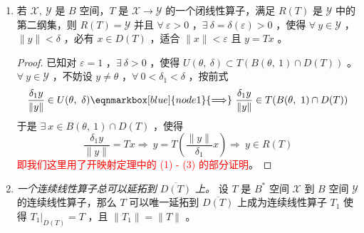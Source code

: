 \begin{enumerate}[leftmargin=2cm, label=\arabic*]
\begin{proof}
    而后我们证明：$TB(\theta,\ 1)\supset U(\theta,\ \delta)$ ，$\forall\ y_0\in U(\theta,\ \delta)$ ，要证明 $\exists\ x_0\in B(\theta,\ 1)$ ，使得 $Tx_0=y_0$ 。即求方程 $Tx = y_0$ 在 $B(\theta,\ 1)$ 的一个解。我们利用逐步逼近法即可。对于 $y_0\in U(\theta,\ \delta)$ ，考虑 $\exists\ x_1\in B(0,\ \frac{1}{3})$ ，使得 $\|y_0 - Tx_1\| < \frac{\delta}{3}$ 。
    
    而后对 $y = y_0 - Tx_1\in U(\theta,\ \frac{\delta}{3})$ ，$\exists\ x_2\in B(\theta,\ \frac{1}{3^2})$ ，使得
\begin{align*}
    \|y_1 - Tx_2\| < \frac{\delta}{3^2}
\end{align*}
    而后我们构建的这一组，令 $x_0 \triangleq \sum\limits_{n=1}^{\infty} x_n$ ，便有 $x_0 \in B(0,\ 1)$ ，而 
\begin{align*}
    \|y_n\| = \|y_{n-1} - Tx_n\| = \|y_0 - T(x_1 + x_2 + \cdots + x_n)\| < \frac{\delta}{3^n} \to 0
\end{align*}
    而由于 $T$ 是连续的，故而 $Tx_0 = y_0$ 。即 $Y(\theta,\ \delta) \subset TB(\theta,\ 1)$ 。 
\end{proof}
    \item 若 $\mathscr{X},\ \mathscr{Y}$ 是 $B$ 空间，$T$ 是 $\mathscr{X}\to\mathscr{Y}$ 的一个闭线性算子，满足 $R(T)$ 是 $\mathscr{Y}$ 中的第二纲集，则 $R(T) =\mathscr{Y}$ 并且 $\forall\ \varepsilon > 0$ ，$\exists\ \delta = \delta(\varepsilon) > 0$ ，使得 $\forall\ y\in\mathscr{Y}$ ，$\|y\|<\delta$ ，必有 $x\in D(T)$ ，适合 $\|x\| < \varepsilon$ 且 $y = Tx$ 。
\begin{proof}
    已知对 $\varepsilon = 1$ ，$\exists\ \delta > 0$ ，使得 $U(\theta,\ \delta) \subset T(B(\theta,\ 1) \cap D(T))$ 。$\forall\ y\in\mathscr{Y}$ ，不妨设 $y\neq \theta$ ，$\forall\ 0<\delta_1 < \delta$ ，按前式
\begin{equation*}
    \frac{\delta_1 y}{\|y\|} \in U(\theta,\ \delta) \eqnmarkbox[blue]{node1}{\Longrightarrow}\ \frac{\delta_1 y}{\|y\|}\in T(B(\theta,\ 1) \cap D(T))
\end{equation*}
    于是 $\exists\ x\in B(\theta,\ 1)\cap D(T)$ ，使得
\begin{equation*}
    \frac{\delta_1 y}{\|y\|} = Tx \Longrightarrow\ y = T\left(\frac{\|y\|}{\delta_1}x\right) \Longrightarrow\ y\in R(T)
\end{equation*}
    \textcolor{red}{即我们这里用了开映射定理中的 (1) - (3) 的部分证明}。
\end{proof}
    \item \textit{一个连续线性算子总可以延拓到 $\overline{D(T)}$ 上。} 设 $T$ 是 $B^*$  空间 $\mathscr{X}$ 到 $B$ 空间 $\mathscr{Y}$ 的连续线性算子，那么 $T$ 可以唯一延拓到 $\overline{D(T)}$ 上成为连续线性算子 $T_1$ 使得 $T_1\bigg|_{D(T)} = T$ ，且 $\|T_1\| = \|T\|$ 。

\end{enumerate}
